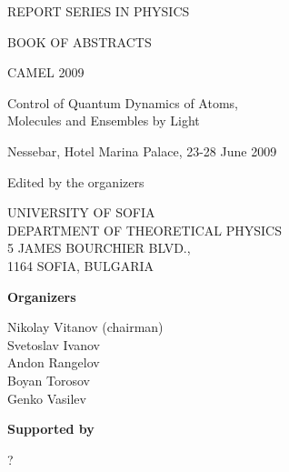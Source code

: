\documentclass[12pt]{book}
\begin{document}
\frontmatter

\fancyhead{}
\fancyfoot{}

\begin{center}
\vspace{0.5cm}
REPORT SERIES IN PHYSICS\\


\vspace{2.5cm}

{\LARGE BOOK OF  ABSTRACTS}\\

\vspace{2cm}

{\Large CAMEL 2009}\\

\vspace{1cm}

Control of Quantum Dynamics of Atoms,\\
Molecules and Ensembles by Light 

\vspace{0.5cm}

Nessebar, Hotel Marina Palace, 23-28 June 2009\\

\vspace{2cm}

Edited by the organizers

\vspace{8cm}

UNIVERSITY OF SOFIA\\
DEPARTMENT OF THEORETICAL PHYSICS\\
5 JAMES BOURCHIER BLVD.,\\
1164 SOFIA, BULGARIA\\

\end{center}

\pagebreak

\fancyfoot[CO,CE]{\thepage}
\textbf{Organizers}

Nikolay Vitanov (chairman)\\
Svetoslav Ivanov\\
Andon Rangelov\\
Boyan Torosov\\
Genko Vasilev\\

\vspace{1.5cm}

\textbf{Supported by}

?

\pagebreak
\end{document}
